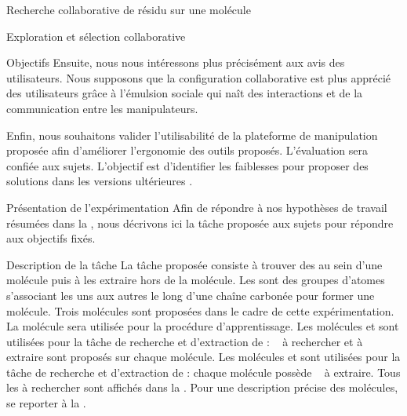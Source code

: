 \documentclass[myfrancais,ngerman,english,french]{mythesis}
\begin{document}
\begin{mychapter}{Recherche collaborative de résidu sur une molécule}
\begin{mysection}{Exploration et sélection collaborative}
\begin{mysubsection}{Objectifs}
				Ensuite, nous nous intéressons plus précisément aux avis des utilisateurs.
				Nous supposons que la configuration collaborative est plus apprécié des utilisateurs grâce à l'émulsion sociale qui naît des interactions et de la communication entre les manipulateurs.

				Enfin, nous souhaitons valider l'utilisabilité de la plateforme de manipulation proposée afin d'améliorer l'ergonomie des outils proposés.
				L'évaluation sera confiée aux sujets.
				L'objectif est d'identifier les faiblesses pour proposer des solutions dans les versions ultérieures \myShaddock.
			\end{mysubsection}
		\end{mysection}
		\begin{mysection}{Présentation de l'expérimentation}
			Afin de répondre à nos hypothèses de travail résumées dans la , nous décrivons ici la tâche proposée aux sujets pour répondre aux objectifs fixés.
			\begin{mysubsection}{Description de la tâche}
				La tâche proposée consiste à trouver des  au sein d'une molécule puis à les extraire hors de la molécule.
				Les  sont des groupes d'atomes s'associant les uns aux autres le long d'une chaîne carbonée pour former une molécule.
				Trois molécules sont proposées dans le cadre de cette expérimentation.
				La molécule \myTRPZIPPER sera utilisée pour la procédure d'apprentissage.
				Les molécules \myTRPCAGE et \myPrion sont utilisées pour la tâche de recherche et d'extraction de  : ~ à rechercher et à extraire sont proposés sur chaque molécule.
				Les molécules \myTRPCAGE et \myPrion sont utilisées pour la tâche de recherche et d'extraction de  : chaque molécule possède ~ à extraire.
				Tous les  à rechercher sont affichés dans la .
				Pour une description précise des molécules, se reporter à la .


\end{mysubsection}
\end{mysection}
\end{mychapter}
\end{document}
